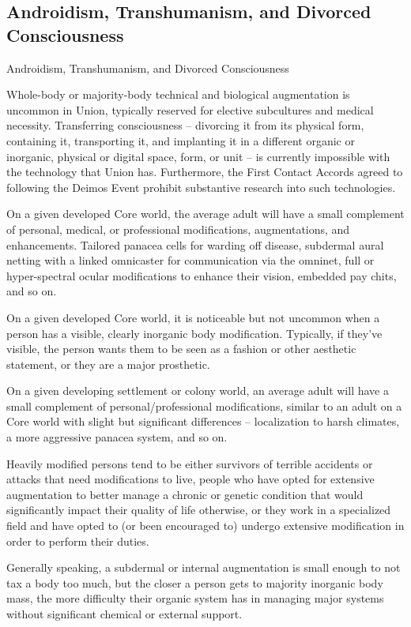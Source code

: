 \subsection{Androidism, Transhumanism, and Divorced Consciousness}
Androidism, Transhumanism, and Divorced Consciousness  

Whole-body or majority-body technical and biological augmentation is uncommon in Union,  
typically reserved for elective subcultures and medical necessity. Transferring consciousness --  
divorcing it from its physical form, containing it, transporting it, and implanting it in a different  
organic or inorganic, physical or digital space, form, or unit -- is currently impossible with the  
technology that Union has. Furthermore, the First Contact Accords agreed to following the  
Deimos Event prohibit substantive research into such technologies.  
 

On a given developed Core world, the average adult will have a small complement of personal,  
medical, or professional modifications, augmentations, and enhancements. Tailored panacea  
cells for warding off disease, subdermal aural netting with a linked omnicaster for communication  
via the omninet, full or hyper-spectral ocular modifications to enhance their vision, embedded  
pay chits, and so on.
 

On a given developed Core world, it is noticeable but not uncommon when a person has a  
visible, clearly inorganic body modification. Typically, if they’ve visible, the person wants them to  
be seen as a fashion or other aesthetic statement, or they are a major prosthetic. 
 
 
 
On a given developing settlement or colony world, an average adult will have a small  
complement of personal/professional modifications, similar to an adult on a Core world with  
slight but significant differences -- localization to harsh climates, a more aggressive panacea  
system, and so on. 
 

Heavily modified persons tend to be either survivors of terrible accidents or attacks that need  
modifications to live, people who have opted for extensive augmentation to better manage a  
chronic or genetic condition that would significantly impact their quality of life otherwise, or they  
work in a specialized field and have opted to (or been encouraged to) undergo extensive  
modification in order to perform their duties. 
 

Generally speaking, a subdermal or internal augmentation is small enough to not tax a body too  
much, but the closer a person gets to majority inorganic body mass, the more difficulty their  
organic system has in managing major systems without significant chemical or external support. 
 

